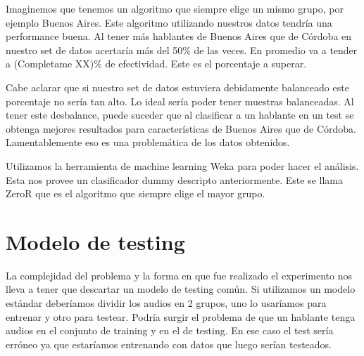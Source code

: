 \documentclass[11pt,a4paper,twoside]{tesis}
\begin{document}
Imaginemos que tenemos un algoritmo que siempre elige un mismo grupo, por ejemplo Buenos Aires. Este algoritmo utilizando nuestros datos tendría una performance buena. Al tener más hablantes de Buenos Aires que de Córdoba en nuestro set de datos acertaría más del 50\% de las veces. En promedio va a tender a (Completame XX)\% de efectividad. Este es el porcentaje a superar. 



Cabe aclarar que si nuestro set de datos estuviera debidamente balanceado este porcentaje no sería tan alto. Lo ideal sería poder tener muestras balanceadas. Al tener este desbalance, puede suceder que al clasificar a un hablante en un test se obtenga mejores resultados para características de Buenos Aires que de Córdoba. Lamentablemente eso es una problemática de los datos obtenidos.

Utilizamos la herramienta de machine learning Weka para poder hacer el análisis. Esta nos provee un clasificador dummy descripto anteriormente. Este se llama ZeroR que es el algoritmo que siempre elige el mayor grupo.

\section{Modelo de testing}

La complejidad del problema y la forma en que fue realizado el experimento nos lleva a tener que descartar un modelo de testing común. Si utilizamos un modelo estándar deberíamos dividir los audios en 2 grupos, uno lo usaríamos para entrenar y otro para testear. Podría surgir el problema de que un hablante tenga audios en el conjunto de training y en el de testing. En ese caso el test sería erróneo ya que estaríamos entrenando con datos que luego serían testeados.
\end{document}
